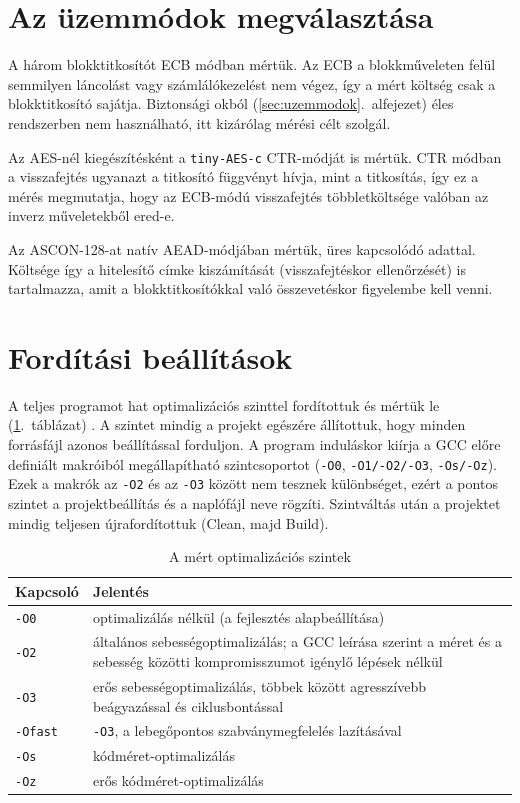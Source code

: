 \documentclass[a4paper,12pt]{report}
\theoremstyle{definition}
\theoremstyle{remark}
\begin{document}
\section{Az üzemmódok megválasztása}\label{sec:uzemmod_valasztas}

A három blokktitkosítót ECB módban mértük. Az ECB a blokkműveleten felül semmilyen láncolást vagy számlálókezelést nem végez, így a mért költség csak a blokktitkosító sajátja. Biztonsági okból (\ref{sec:uzemmodok}.~alfejezet) éles rendszerben nem használható, itt kizárólag mérési célt szolgál.

Az AES-nél kiegészítésként a \texttt{tiny-AES-c} CTR-módját is mértük. CTR módban a visszafejtés ugyanazt a titkosító függvényt hívja, mint a titkosítás, így ez a mérés megmutatja, hogy az ECB-módú visszafejtés többletköltsége valóban az inverz műveletekből ered-e.

Az ASCON-128-at natív AEAD-módjában mértük, üres kapcsolódó adattal. Költsége így a hitelesítő címke kiszámítását (visszafejtéskor ellenőrzését) is tartalmazza, amit a blokktitkosítókkal való összevetéskor figyelembe kell venni.

\section{Fordítási beállítások}\label{sec:forditas}

A teljes programot hat optimalizációs szinttel fordítottuk és mértük le (\ref{tab:build_config}.~táblázat) \cite{GCCopt}. A szintet mindig a projekt egészére állítottuk, hogy minden forrásfájl azonos beállítással forduljon. A program induláskor kiírja a GCC előre definiált makróiból megállapítható szintcsoportot (\texttt{-O0}, \texttt{-O1/-O2/-O3}, \texttt{-Os/-Oz}). Ezek a makrók az \texttt{-O2} és az \texttt{-O3} között nem tesznek különbséget, ezért a pontos szintet a projektbeállítás és a naplófájl neve rögzíti. Szintváltás után a projektet mindig teljesen újrafordítottuk (Clean, majd Build).

\begin{table}[htbp]
    \centering
    \small
    \caption{A mért optimalizációs szintek}
    \label{tab:build_config}
    \begin{tabular}{|l|p{11cm}|}
        \hline
        \textbf{Kapcsoló} & \textbf{Jelentés} \\ \hline
        \texttt{-O0} & optimalizálás nélkül (a fejlesztés alapbeállítása) \\ \hline
        \texttt{-O2} & általános sebességoptimalizálás; a GCC leírása szerint a méret és a sebesség közötti kompromisszumot igénylő lépések nélkül \\ \hline
        \texttt{-O3} & erős sebességoptimalizálás, többek között agresszívebb beágyazással és ciklusbontással \\ \hline
        \texttt{-Ofast} & \texttt{-O3}, a lebegőpontos szabványmegfelelés lazításával \\ \hline
        \texttt{-Os} & kódméret-optimalizálás \\ \hline
        \texttt{-Oz} & erős kódméret-optimalizálás \\ \hline
    \end{tabular}
\end{table}
\end{document}

